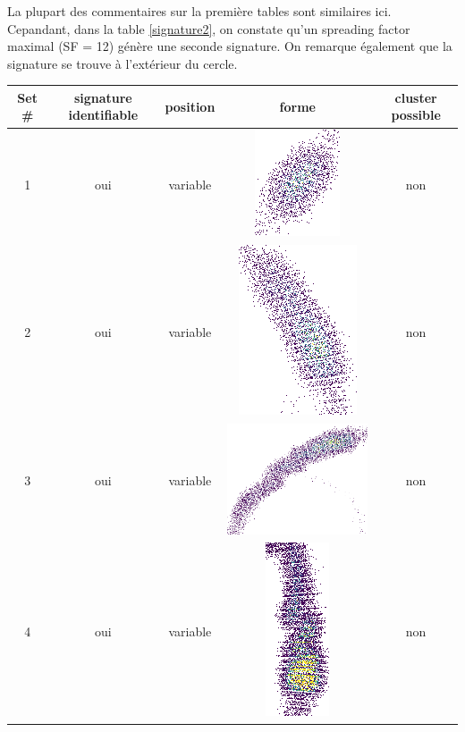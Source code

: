 La plupart des commentaires sur la première tables sont similaires ici. Cepandant, dans la table \ref{signature2}, on constate qu'un spreading factor maximal (SF = 12) génère une seconde signature. On remarque également que la signature se trouve à l'extérieur du cercle.

\begin{table}[h]
\centering
\begin{tabular}{|c|c|c|c|c|}
\hline
Set \# & signature identifiable & position & forme & cluster possible\\
\hline
1 & oui & variable & \includegraphics[scale=0.2]{images/set23.png}  & non \\
\hline
2 & oui & variable & \includegraphics[scale=0.2]{images/set24.png}  & non \\
\hline
3 & oui & variable & \includegraphics[scale=0.2]{images/set25.png}  & non \\
\hline
4 & oui & variable & \includegraphics[scale=0.2]{images/set26.png}  & non \\

\end{tabular}
\end{table}
